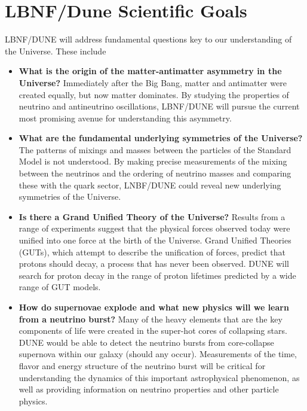 \chapter{LBNF/Dune Scientific Goals}
\label{ch:physics-goals}




LBNF/DUNE will address fundamental questions key to our understanding of the Universe. These include
\begin{itemize}
   \item {\bf What is the origin of the matter-antimatter asymmetry in the Universe?} Immediately after
                    the Big Bang, matter and antimatter were created equally, but now matter dominates.
                    By studying the properties of neutrino and antineutrino oscillations, LBNF/DUNE 
                    will pursue the current most promising avenue for understanding this asymmetry.
   \item {\bf What are the fundamental underlying symmetries of the Universe?} The patterns of mixings and masses between the particles of the Standard Model is not understood. By making precise measurements of the mixing between the neutrinos and the ordering of neutrino masses and comparing these with the quark sector, LNBF/DUNE could reveal new underlying symmetries of the Universe.
  \item{\bf  Is there a Grand Unified Theory of the Universe?} Results from a range of experiments suggest that the
                 physical forces observed today were unified into one force at the birth of the Universe.
                Grand Unified Theories (GUTs), which attempt to describe the unification of forces,
                predict that protons should decay, a process that has never been observed. DUNE will 
                search for proton decay in the range of proton lifetimes predicted by a wide range of GUT models.
   \item{\bf How do supernovae explode and what new physics will we learn from a neutrino burst?}
   Many of the heavy elements that are the key components of life were created in the super-hot cores of collapsing stars. DUNE would be able to detect the neutrino bursts from core-collapse supernova within our galaxy (should any occur). Measurements of the time, flavor and energy structure of the neutrino burst will be critical for understanding the dynamics of this important astrophysical phenomenon, as well as providing information on neutrino properties and other particle physics.
\end{itemize}

